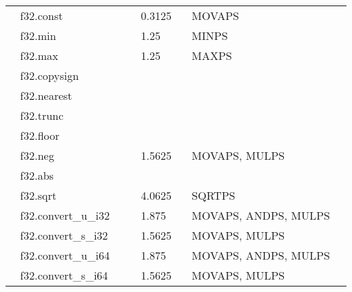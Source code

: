 \documentclass{article}
\begin{document}
\begin{table}
\begin{tabular}{|l|l|l|l|}
\multicolumn{1}{l}{~ f32.const}             & \multicolumn{1}{l}{~ 0.3125} & \multicolumn{1}{l}{~ MOVAPS}                         & \multicolumn{1}{l}{}  \\
\multicolumn{1}{l}{~ f32.min}               & \multicolumn{1}{l}{~ 1.25}   & \multicolumn{1}{l}{~ MINPS}                          & \multicolumn{1}{l}{}  \\
\multicolumn{1}{l}{~ f32.max}               & \multicolumn{1}{l}{~ 1.25}   & \multicolumn{1}{l}{~ MAXPS}                          & \multicolumn{1}{l}{}  \\
\multicolumn{1}{l}{~ f32.copysign}          & \multicolumn{1}{l}{}         & \multicolumn{1}{l}{}                                 & \multicolumn{1}{l}{}  \\
\multicolumn{1}{l}{~ f32.nearest}           & \multicolumn{1}{l}{}         & \multicolumn{1}{l}{}                                 & \multicolumn{1}{l}{}  \\
\multicolumn{1}{l}{~ f32.trunc}             & \multicolumn{1}{l}{}         & \multicolumn{1}{l}{}                                 & \multicolumn{1}{l}{}  \\
\multicolumn{1}{l}{~ f32.floor}             & \multicolumn{1}{l}{}         & \multicolumn{1}{l}{}                                 & \multicolumn{1}{l}{}  \\
\multicolumn{1}{l}{~ f32.neg}               & \multicolumn{1}{l}{~ 1.5625} & \multicolumn{1}{l}{~ MOVAPS, MULPS}                  & \multicolumn{1}{l}{}  \\
\multicolumn{1}{l}{~ f32.abs}               & \multicolumn{1}{l}{}         & \multicolumn{1}{l}{}                                 & \multicolumn{1}{l}{}  \\
\multicolumn{1}{l}{~ f32.sqrt}              & \multicolumn{1}{l}{~ 4.0625} & \multicolumn{1}{l}{~ SQRTPS}                         & \multicolumn{1}{l}{}  \\
\multicolumn{1}{l}{~ f32.convert\_u\_i32~~} & \multicolumn{1}{l}{~ 1.875}  & \multicolumn{1}{l}{~ MOVAPS, ANDPS, MULPS}           & \multicolumn{1}{l}{}  \\
\multicolumn{1}{l}{~ f32.convert\_s\_i32}   & \multicolumn{1}{l}{~ 1.5625} & \multicolumn{1}{l}{~ MOVAPS, MULPS}                  & \multicolumn{1}{l}{}  \\
\multicolumn{1}{l}{~ f32.convert\_u\_i64}   & \multicolumn{1}{l}{~ 1.875}  & \multicolumn{1}{l}{~ MOVAPS, ANDPS, MULPS}           & \multicolumn{1}{l}{}  \\
\multicolumn{1}{l}{~ f32.convert\_s\_i64}   & \multicolumn{1}{l}{~ 1.5625} & \multicolumn{1}{l}{~ MOVAPS, MULPS}                  & \multicolumn{1}{l}{}  \\

\end{tabular}
\end{table}
\end{document}
